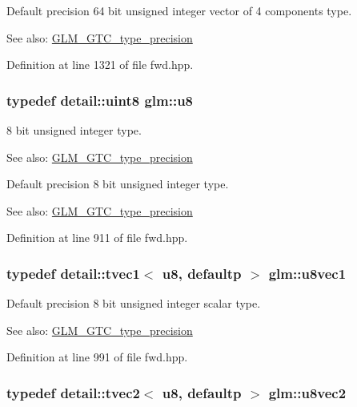 Default precision 64 bit unsigned integer vector of 4 components type. \begin{Desc}
\item[See also:]\hyperlink{group__gtc__type__precision}{GLM\_\-GTC\_\-type\_\-precision} \end{Desc}


Definition at line 1321 of file fwd.hpp.\hypertarget{group__gtc__type__precision_g5e3dc67373d5068997d2d9f41c9024d2}{
\subsubsection[u8]{\setlength{\rightskip}{0pt plus 5cm}typedef detail::uint8 {\bf glm::u8}}}
\label{group__gtc__type__precision_g5e3dc67373d5068997d2d9f41c9024d2}


8 bit unsigned integer type. \begin{Desc}
\item[See also:]\hyperlink{group__gtc__type__precision}{GLM\_\-GTC\_\-type\_\-precision}\end{Desc}
Default precision 8 bit unsigned integer type. \begin{Desc}
\item[See also:]\hyperlink{group__gtc__type__precision}{GLM\_\-GTC\_\-type\_\-precision} \end{Desc}


Definition at line 911 of file fwd.hpp.\hypertarget{group__gtc__type__precision_gf0155c700da11c0b5518a777d1f0cd23}{
\subsubsection[u8vec1]{\setlength{\rightskip}{0pt plus 5cm}typedef detail::tvec1$<$ u8, defaultp $>$ {\bf glm::u8vec1}}}
\label{group__gtc__type__precision_gf0155c700da11c0b5518a777d1f0cd23}


Default precision 8 bit unsigned integer scalar type. \begin{Desc}
\item[See also:]\hyperlink{group__gtc__type__precision}{GLM\_\-GTC\_\-type\_\-precision} \end{Desc}


Definition at line 991 of file fwd.hpp.\hypertarget{group__gtc__type__precision_ga7ea171741c23b5bb2a3c91fe8c84e8a}{
\subsubsection[u8vec2]{\setlength{\rightskip}{0pt plus 5cm}typedef detail::tvec2$<$ u8, defaultp $>$ {\bf glm::u8vec2}}}
\label{group__gtc__type__precision_ga7ea171741c23b5bb2a3c91fe8c84e8a}


